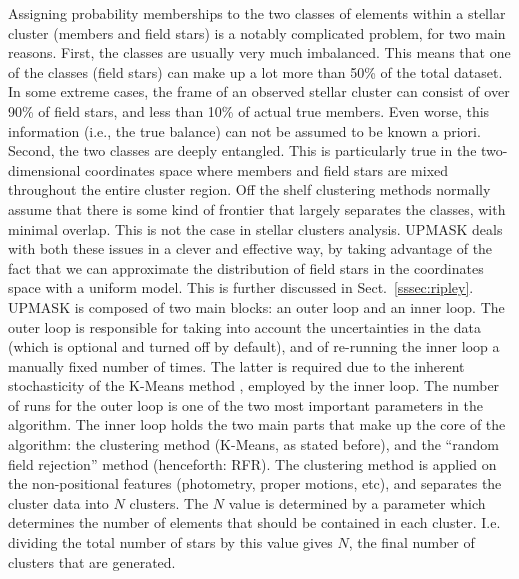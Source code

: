 \documentclass{aa}
\begin{document}
 Assigning probability memberships to the two classes of elements within a 
 stellar cluster (members and field stars) is a notably complicated
 problem, for two main reasons. First, the classes are usually very much
 imbalanced. This means that one of the classes (field stars) can make up a
 lot more than 50\% of the total dataset. In some extreme cases, the frame of
 an observed stellar cluster can consist of over 90\% of field stars, and less
 than 10\% of actual true members. Even worse, this information (i.e., the
 true balance) can not be assumed to be known a priori.
 Second, the two classes are deeply entangled. This is particularly true in the
 two-dimensional coordinates space where members and field stars are mixed
 throughout the entire cluster region. Off the shelf clustering methods
 normally assume that there is some kind of frontier that largely separates
 the classes, with minimal overlap. This is not the case in stellar clusters
 analysis.
 UPMASK deals with both these issues in a clever and effective way, by taking
 advantage of the fact that we can approximate the distribution of field stars
 in the coordinates space with a uniform model. This is further discussed
 in Sect.~\ref{sssec:ripley}.\\

 UPMASK is composed of two main blocks: an outer loop and an inner
 loop. The outer loop is responsible for taking into account the uncertainties
 in the data (which is optional and turned off by default), and of re-running
 the inner loop a manually fixed number of times. The latter is required due
 to the inherent stochasticity of the K-Means method \citep{macqueen1967},
 employed by the inner loop. The number of runs for the outer loop is one of
 the two most important parameters in the algorithm.
 The inner loop holds the two main parts that make up the core of the
 algorithm: the clustering method (K-Means, as stated before), and the
 ``random field rejection'' method (henceforth: RFR).
 The clustering method is applied on the non-positional features (photometry,
 proper motions, etc), and separates the cluster data into $N$ clusters. The
 $N$ value is determined by a parameter
 which determines the number of elements that should be
 contained in each cluster. I.e. dividing the total number of stars by this
 value gives $N$, the final number of clusters that are generated.
 
\end{document}
